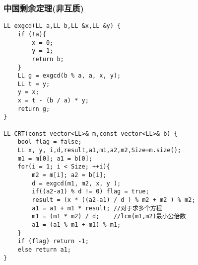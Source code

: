 \subsubsection{中国剩余定理(非互质)}
\begin{verbatim}
LL exgcd(LL a,LL b,LL &x,LL &y) {
    if (!a){
        x = 0;
        y = 1;
        return b;
    }
    LL g = exgcd(b % a, a, x, y);
    LL t = y;
    y = x;
    x = t - (b / a) * y;
    return g;
}

LL CRT(const vector<LL>& m,const vector<LL>& b) {
    bool flag = false;
    LL x, y, i,d,result,a1,m1,a2,m2,Size=m.size();
    m1 = m[0]; a1 = b[0];
    for(i = 1; i < Size; ++i){
        m2 = m[i]; a2 = b[i];
        d = exgcd(m1, m2, x, y );
        if((a2-a1) % d != 0) flag = true;
        result = (x * ((a2-a1) / d ) % m2 + m2 ) % m2;
        a1 = a1 + m1 * result; //对于求多个方程
        m1 = (m1 * m2) / d;    //lcm(m1,m2)最小公倍数
        a1 = (a1 % m1 + m1) % m1;
    }
    if (flag) return -1;
    else return a1;
}
\end{verbatim}
